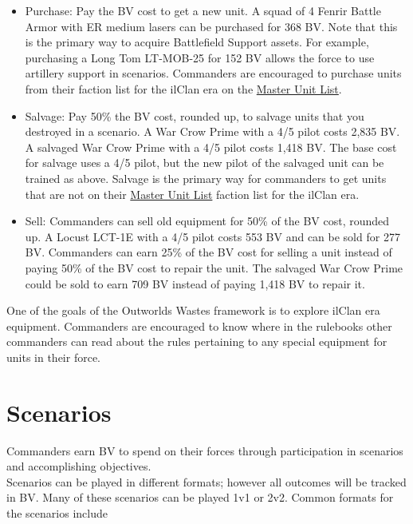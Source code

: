 \documentclass[UTF8]{article}
\begin{document}
\begin{itemize}
\item Purchase: Pay the BV cost to get a new unit.
A squad of 4 Fenrir Battle Armor with ER medium lasers can be purchased for 368 BV.
Note that this is the primary way to acquire Battlefield Support assets.
For example, purchasing a Long Tom LT-MOB-25 for 152 BV allows the force to use artillery support in scenarios.
Commanders are encouraged to purchase units from their faction list for the ilClan era on the \href{http://www.masterunitlist.info/}{Master Unit List}.

\item Salvage: Pay 50\% the BV cost, rounded up, to salvage units that you destroyed in a scenario.
A War Crow Prime with a 4/5 pilot costs 2,835 BV.
A salvaged War Crow Prime with a 4/5 pilot costs 1,418 BV.
The base cost for salvage uses a 4/5 pilot, but the new pilot of the salvaged unit can be trained as above.
Salvage is the primary way for commanders to get units that are not on their \href{http://www.masterunitlist.info/}{Master Unit List} faction list for the ilClan era.

\item Sell: Commanders can sell old equipment for 50\% of the BV cost, rounded up.
A Locust LCT-1E with a 4/5 pilot costs 553 BV and can be sold for 277 BV.
Commanders can earn 25\% of the BV cost for selling a unit instead of paying 50\% of the BV cost to repair the unit.
The salvaged War Crow Prime could be sold to earn 709 BV instead of paying 1,418 BV to repair it.

\end{itemize}

One of the goals of the Outworlds Wastes framework is to explore ilClan era equipment.
Commanders are encouraged to know where in the rulebooks other commanders can read about the rules pertaining to any special equipment for units in their force.

\newpage

\section{Scenarios}

Commanders earn BV to spend on their forces through participation in scenarios and accomplishing objectives.\\

Scenarios can be played in different formats; however all outcomes will be tracked in BV.
Many of these scenarios can be played 1v1 or 2v2.
Common formats for the scenarios include
\end{document}
